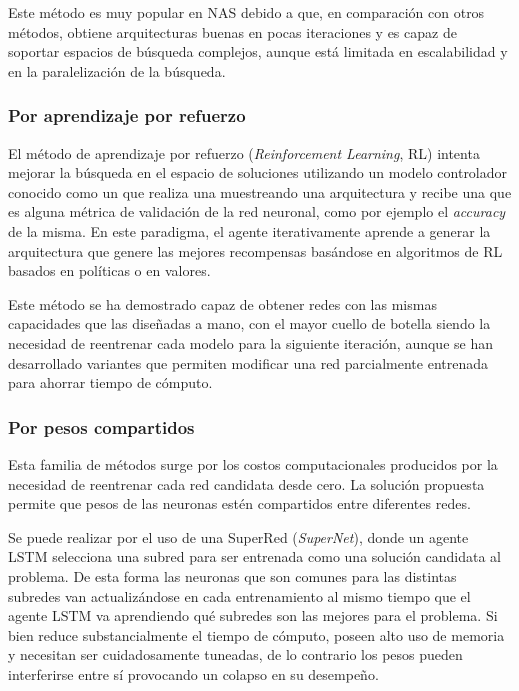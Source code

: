 Este método es muy popular en NAS debido a que, en comparación con otros métodos, obtiene arquitecturas buenas en pocas iteraciones y es capaz de soportar espacios de búsqueda complejos, aunque está limitada en escalabilidad y en la paralelización de la búsqueda.

\subsubsection{Por aprendizaje por refuerzo}
El método de aprendizaje por refuerzo (\textit{Reinforcement Learning}, RL) intenta mejorar la búsqueda en el espacio de soluciones utilizando un modelo controlador conocido como un  que realiza una  muestreando una arquitectura y recibe una  que es alguna métrica de validación de la red neuronal, como por ejemplo el \textit{accuracy} de la misma. En este paradigma, el agente iterativamente aprende a generar la arquitectura que genere las mejores recompensas basándose en algoritmos de RL basados en políticas o en valores.

Este método se ha demostrado capaz de obtener redes con las mismas capacidades que las diseñadas a mano, con el mayor cuello de botella siendo la necesidad de reentrenar cada modelo para la siguiente iteración, aunque se han desarrollado variantes que permiten modificar una red parcialmente entrenada para ahorrar tiempo de cómputo.

\subsubsection{Por pesos compartidos}
Esta familia de métodos surge por los costos computacionales producidos por la necesidad de reentrenar cada red candidata desde cero. La solución propuesta permite que pesos de las neuronas estén compartidos entre diferentes redes.

Se puede realizar por el uso de una SuperRed (\textit{SuperNet}), donde un agente LSTM selecciona una subred para ser entrenada como una solución candidata al problema. De  esta forma las neuronas que son comunes para las distintas subredes van actualizándose en cada entrenamiento al mismo tiempo que el agente LSTM va aprendiendo qué subredes son las mejores para el problema. Si bien reduce substancialmente el tiempo de cómputo, poseen alto uso de memoria y necesitan ser cuidadosamente tuneadas, de lo contrario los pesos pueden interferirse entre sí provocando un colapso en su desempeño.

